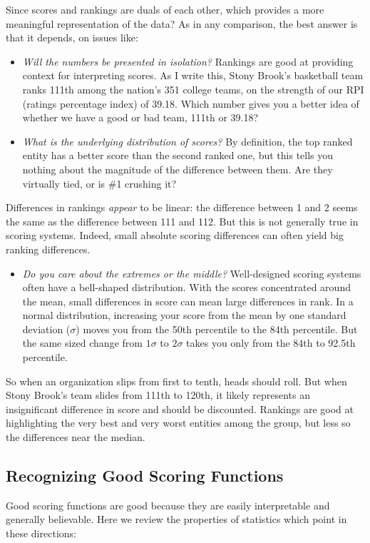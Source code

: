 \documentclass[10pt]{article}
\begin{document}
Since scores and rankings are duals of each other, which provides a more meaningful representation of the data? As in any comparison, the best answer is that it depends, on issues like: 

\begin{itemize}
    \item \textit{Will the numbers be presented in isolation?} Rankings are good at providing context for interpreting scores. As I write this, Stony Brook's basketball team ranks 111th among the nation's 351 college teams, on the strength of our RPI (ratings percentage index) of 39.18. Which number gives you a better idea of whether we have a good or bad team, 111th or 39.18?
    \item \textit{What is the underlying distribution of scores?} By definition, the top ranked entity has a better score than the second ranked one, but this tells you nothing about the magnitude of the difference between them. Are they virtually tied, or is \#1 crushing it?
\end{itemize}

Differences in rankings \textit{appear} to be linear: the difference between 1 and 2 seems the same as the difference between 111 and 112. But this is not generally true in scoring systems. Indeed, small absolute scoring differences can often yield big ranking differences.

\begin{itemize}
    \item \textit{Do you care about the extremes or the middle?} Well-designed scoring systems often have a bell-shaped distribution. With the scores concentrated around the mean, small differences in score can mean large differences in rank. In a normal distribution, increasing your score from the mean by one standard deviation ($\sigma$) moves you from the 50th percentile to the 84th percentile. But the same sized change from $1\sigma$ to $2\sigma$ takes you only from the 84th to 92.5th percentile.
\end{itemize}

So when an organization slips from first to tenth, heads should roll. But when Stony Brook's team slides from 111th to 120th, it likely represents an insignificant difference in score and should be discounted. Rankings are good at highlighting the very best and very worst entities among the group, but less so the differences near the median.

\subsection{Recognizing Good Scoring Functions}
Good scoring functions are good because they are easily interpretable and generally believable. Here we review the properties of statistics which point in these directions:
\end{document}

